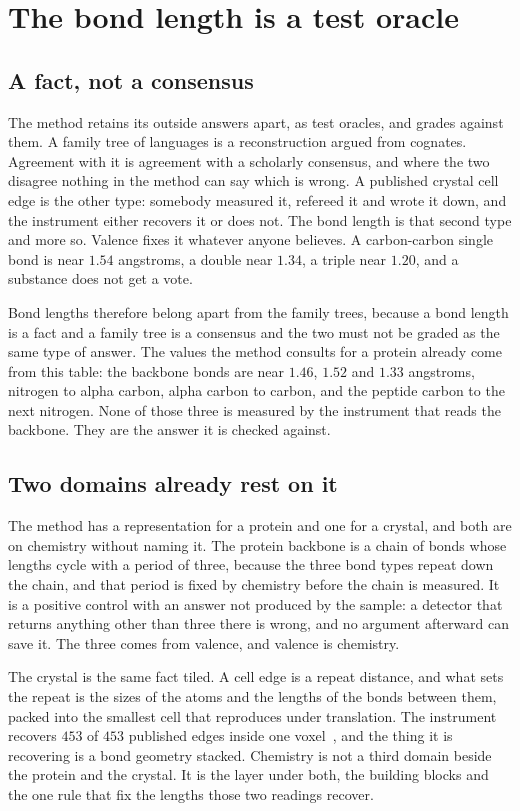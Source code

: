\chapter{The bond length is a test oracle}

\section{A fact, not a consensus}

The method retains its outside answers apart, as test oracles, and grades against them. A family tree
of languages is a reconstruction argued from cognates. Agreement with it is agreement with a
scholarly consensus, and where the two disagree nothing in the method can say which is wrong. A
published crystal cell edge is the other type: somebody measured it, refereed it and wrote it down,
and the instrument either recovers it or does not. The bond length is that second type and more so.
Valence fixes it whatever anyone believes. A carbon-carbon single bond is near $1.54$ angstroms, a
double near $1.34$, a triple near $1.20$, and a substance does not get a vote.

Bond lengths therefore belong apart from the family trees, because a bond length is a fact and a
family tree is a consensus and the two must not be graded as the same type of answer. The values
the method consults for a protein already come from this table: the backbone bonds are near $1.46$,
$1.52$ and $1.33$ angstroms, nitrogen to alpha carbon, alpha carbon to carbon, and the peptide
carbon to the next nitrogen. None of those three is measured by the instrument that reads the
backbone. They are the answer it is checked against.

\section{Two domains already rest on it}

The method has a representation for a protein and one for a crystal, and both are on chemistry
without naming it. The protein backbone is a chain of bonds whose lengths cycle with a period of
three, because the three bond types repeat down the chain, and that period is fixed by chemistry
before the chain is measured. It is a positive control with an answer not produced by the sample: a
detector that returns anything other than three there is wrong, and no argument afterward can save
it. The three comes from valence, and valence is chemistry.

The crystal is the same fact tiled. A cell edge is a repeat distance, and what sets the repeat is the
sizes of the atoms and the lengths of the bonds between them, packed into the smallest cell that
reproduces under translation. The instrument recovers $453$ of $453$ published edges inside one
voxel~\cite{src:Quigg-crystallography}, and the thing it is recovering is a bond geometry stacked.
Chemistry is not a third domain beside the protein and the crystal. It is the layer under both, the
building blocks and the one rule that fix the lengths those two readings recover.

